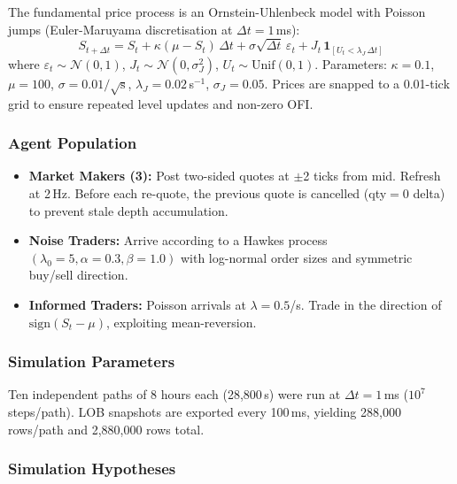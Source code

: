 \documentclass[12pt,a4paper]{article}
\theoremstyle{definition}
\theoremstyle{remark}
\begin{document}
The fundamental price process is an Ornstein-Uhlenbeck model with
Poisson jumps (Euler-Maruyama discretisation at $\Delta t = 1$\,ms):
\begin{equation}
  S_{t+\Delta t} = S_t + \kappa(\mu - S_t)\,\Delta t
    + \sigma\sqrt{\Delta t}\,\varepsilon_t
    + J_t\,\mathbf{1}_{[U_t < \lambda_J\,\Delta t]}
\label{eq:ou}
\end{equation}
where $\varepsilon_t \sim \mathcal{N}(0,1)$, $J_t \sim
\mathcal{N}(0,\sigma_J^2)$, $U_t \sim \mathrm{Unif}(0,1)$.
Parameters: $\kappa=0.1$, $\mu=100$, $\sigma=0.01/\sqrt{\text{s}}$,
$\lambda_J=0.02$\,s$^{-1}$, $\sigma_J=0.05$.
Prices are snapped to a 0.01-tick grid to ensure repeated level
updates and non-zero OFI.

\subsubsection{Agent Population}

\begin{itemize}
  \item \textbf{Market Makers (3):} Post two-sided quotes at $\pm$2
    ticks from mid. Refresh at 2\,Hz. Before each re-quote, the
    previous quote is cancelled (qty$=0$ delta) to prevent stale
    depth accumulation.
  \item \textbf{Noise Traders:} Arrive according to a Hawkes process
    $(\lambda_0=5, \alpha=0.3, \beta=1.0)$ with log-normal order
    sizes and symmetric buy/sell direction.
  \item \textbf{Informed Traders:} Poisson arrivals at $\lambda=0.5$/s.
    Trade in the direction of $\mathrm{sign}(S_t - \mu)$, exploiting
    mean-reversion.
\end{itemize}

\subsubsection{Simulation Parameters}

Ten independent paths of 8 hours each (28,800\,s) were run at
$\Delta t = 1$\,ms ($10^7$ steps/path). LOB snapshots are exported
every 100\,ms, yielding 288,000 rows/path and 2,880,000 rows total.

\subsubsection{Simulation Hypotheses}
\end{document}
